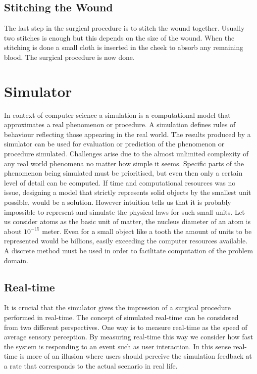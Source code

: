 \subsection*{Stitching the Wound}
The last step in the surgical procedure is to stitch the wound together. Usually two
stitches is enough but this depends on the size of the
wound. When the stitching is done a small cloth is inserted in the
cheek to absorb any remaining blood. The surgical procedure is now
done.

\section{Simulator}
\label{sec:simulator}
In context of computer science a simulation is a computational model
that approximates a real phenomenon or procedure. A simulation defines
rules of behaviour reflecting those appearing in the real world. The
results produced by a simulator can be used for evaluation or
prediction of the phenomenon or procedure simulated.  
%
Challenges arise due to the almost unlimited complexity of any real world
phenomena no matter how simple it seems.
Specific parts of the phenomenon being
simulated must be prioritised, but even then only a certain level of detail
can be computed. 
%
If time and computational resources was no issue, designing a
model that strictly represents solid objects by the smallest unit
possible, would be a solution. 
However intuition tells us that it is probably impossible to represent and 
simulate the physical laws for such small units. Let us consider atoms
as the basic unit of matter, the nucleus diameter of an atom is about $10^{-15}$
meter. Even for a small object like a tooth the amount of units to
be represented would be billions, easily exceeding the computer
resources available. A discrete method must be used in order to
facilitate computation of the problem domain. 


\subsection{Real-time}
\label{sec:real-time}
It is crucial that the simulator gives the impression of a surgical
procedure performed in real-time. 
The concept of simulated real-time can be considered from two
different perspectives. One way is to measure real-time as the speed
of average sensory perception. By measuring real-time this way we consider 
how fast the system is responding to an event such as user
interaction. In this sense real-time is more of an illusion where
users should perceive the simulation feedback at a rate that 
corresponds to the actual scenario in real life. 

